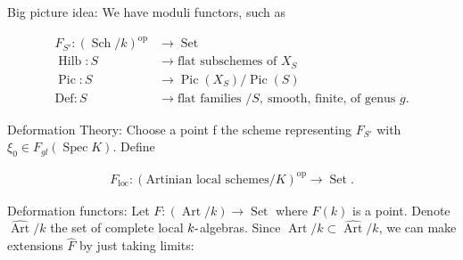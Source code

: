 Big picture idea: We have moduli functors, such as

\begin{align*} F_{S'}: ({\operatorname{Sch}}/k)^\operatorname{op}&\to {\operatorname{Set}}\\ \operatorname{Hilb}: S &\to \text{flat subschemes of } X_S \\ {\operatorname{Pic}}: S &\to {\operatorname{Pic}}(X_S)/{\operatorname{Pic}}(S) \\ \mathrm{Def}: S &\to \text{flat families } / S,~ \text{smooth, finite, of genus } g .\end{align*}

Deformation Theory: Choose a point f the scheme representing \(F_{S'}\)
with \(\xi_0 \in F_{gl}(\operatorname{Spec}K)\). Define

\begin{align*} F_{\text{loc}}: (\text{Artinian local schemes} / K)^\operatorname{op}\to {\operatorname{Set}} .\end{align*}

\begin{center}
\end{center}

Deformation functors: Let
\(F: (\operatorname{Art}/k) \to {\operatorname{Set}}\) where \(F(k)\) is
a point. Denote \(\widehat{\operatorname{Art}}/k\) the set of complete
local \(k{\hbox{-}}\)algebras. Since
\(\operatorname{Art}/k \subset \widehat{\operatorname{Art}} / k\), we
can make extensions \(\widehat{F}\) by just taking limits:

\begin{center}
\end{center}

